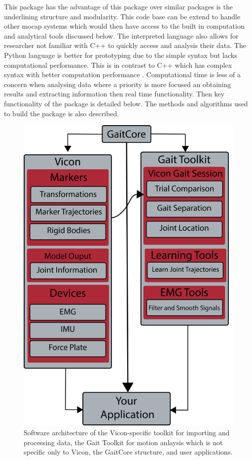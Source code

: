 This package has the advantage of this package over similar packages is the underlining structure and modularity. This code base can be extend to handle other mocap systems which would then have access to the built in computation and analytical tools discussed below. The interpreted language also allows for researcher not familiar with C++ to quickly access and analysis their data. The Python language is better for prototyping due to the simple syntax but lacks computational performance. This is in contrast to C++ which has complex syntax with better computation performance \cite{varisteas2018distributed} \cite{bargiacchi2020ai}. Computational time is less of a concern when analysing data where a priority is more focused an obtaining results and extracting information then real time functionality. Then key functionality of the package is detailed below. The methods and algorithms used to build the package is also described. 

\begin{figure}
    \centering
    \includegraphics[scale=0.15]{images/software/software.png}
    \caption[Software Architecture]{Software architecture of the Vicon-specific toolkit for importing and processing data, the Gait Toolkit for motion anlaysis which is not specific only to Vicon, the GaitCore structure, and user applications.}
    \label{fig:software}
\end{figure}


